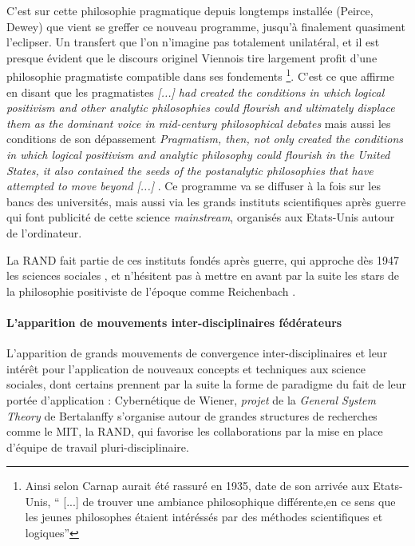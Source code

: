 C'est sur cette philosophie pragmatique depuis longtemps installée (Peirce, Dewey) que vient se greffer ce nouveau programme, jusqu'à finalement quasiment l'eclipser. Un transfert que l'on n'imagine pas totalement unilatéral, et il est presque évident que le discours originel Viennois tire largement profit d'une philosophie pragmatiste compatible dans ses fondements \footnote{ Ainsi selon \textcite[149]{Ouelbani2006} Carnap aurait été rassuré en 1935, date de son arrivée aux Etats-Unis, \enquote{ [...] de trouver une ambiance philosophique différente,en ce sens que les jeunes philosophes étaient intéréssés par des méthodes scientifiques et logiques}}. C'est ce que \textcite[123]{Wilson1995} affirme en disant que les pragmatistes \textit{[...] had created the conditions in which logical positivism and other analytic philosophies could flourish and ultimately displace them as the dominant voice in mid-century philosophical debates} mais aussi les conditions de son dépassement \textit{Pragmatism, then, not only created the conditions in which logical positivism and analytic philosophy could flourish in the United States, it also contained the seeds of the postanalytic philosophies that have attempted to move beyond [...] }. Ce programme va se diffuser à la fois sur les bancs des universités, mais aussi via les grands instituts scientifiques après guerre qui font publicité de cette science \textit{mainstream}, organisés aux Etats-Unis autour de l'ordinateur. 

La RAND fait partie de ces instituts fondés après guerre, qui approche dès 1947 les sciences sociales \autocite{Rand106}, et n'hésitent pas à mettre en avant par la suite les stars de la philosophie positiviste de l'époque comme Reichenbach \autocite[384-385]{Barnes2011} .

\paragraph{L'apparition de mouvements inter-disciplinaires fédérateurs}

L'apparition de grands mouvements de convergence inter-disciplinaires et leur intérêt pour l'application de nouveaux concepts et techniques aux science sociales, dont certains prennent par la suite la forme de paradigme du fait de leur portée d'application : Cybernétique de Wiener, \textit{projet} de la \textit{General System Theory} de Bertalanffy \autocite[9]{Pouvreau2013} s'organise autour de grandes structures de recherches comme le MIT, la RAND, qui favorise les collaborations par la mise en place d'équipe de travail pluri-disciplinaire.

